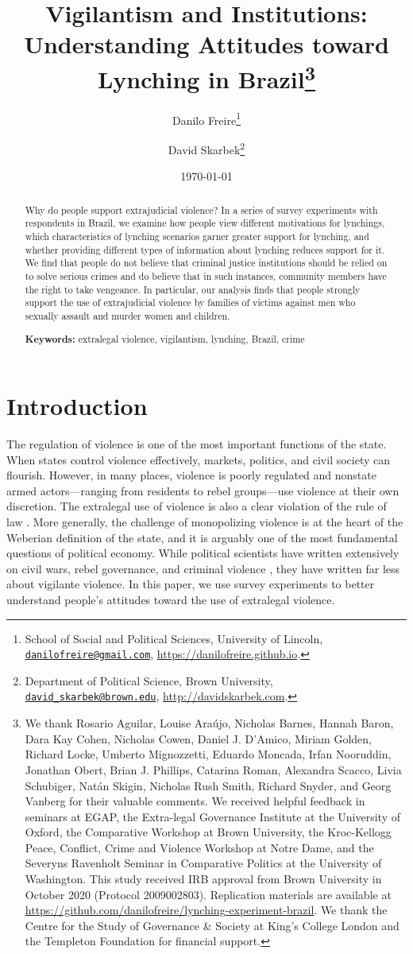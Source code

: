 \documentclass[12pt,ansiapaper]{article}
\title{Vigilantism and Institutions:\\ Understanding Attitudes toward Lynching in Brazil\footnote{We thank Rosario Aguilar, Louise Araújo, Nicholas Barnes, Hannah Baron, Dara Kay Cohen, Nicholas Cowen, Daniel J. D'Amico, Miriam Golden, Richard Locke, Umberto Mignozzetti, Eduardo Moncada, Irfan Nooruddin, Jonathan Obert, Brian J. Phillips, Catarina Roman, Alexandra Scacco, Livia Schubiger, Natán Skigin, Nicholas Rush Smith, Richard Snyder, and Georg Vanberg for their valuable comments. We received helpful feedback in seminars at EGAP, the Extra-legal Governance Institute at the University of Oxford, the Comparative Workshop at Brown University, the Kroc-Kellogg Peace, Conflict, Crime and Violence Workshop at Notre Dame, and the Severyns Ravenholt Seminar in Comparative Politics at the University of Washington. This study received IRB approval from Brown University in October 2020 (Protocol 2009002803). Replication materials are available at \url{https://github.com/danilofreire/lynching-experiment-brazil}. We thank the Centre for the Study of Governance \& Society at King's College London and the Templeton Foundation for financial support.}}
\author{Danilo Freire\footnote{School of Social and Political Sciences, University of Lincoln, \href{mailto:danilofreire@gmail.com}{\texttt{danilofreire@gmail.com}}, \url{https://danilofreire.github.io}.} \and David Skarbek\footnote{Department of Political Science, Brown University, \href{mailto:david_skarbek@brown.edu}{\texttt{david\_skarbek@brown.edu}}, \url{http://davidskarbek.com}.}}
\date{\today}
\begin{document}
\maketitle

\begin{abstract}
\doublespacing \noindent Why do people support extrajudicial violence? In a series of survey experiments with respondents in Brazil, we examine how people view different motivations for lynchings, which characteristics of lynching scenarios garner greater support for lynching, and whether providing different types of information about lynching reduces support for it. We find that people do not believe that criminal justice institutions should be relied on to solve serious crimes and do believe that in such instances, community members have the right to take vengeance. In particular, our analysis finds that people strongly support the use of extrajudicial violence by families of victims against men who sexually assault and murder women and children. 
\vspace{.25cm}

\noindent \textbf{Keywords:} extralegal violence, vigilantism, lynching, Brazil, crime 
\vspace{.25cm}

\end{abstract}

\newpage

\section{Introduction}
\label{sec:introduction}

\doublespacing

The regulation of violence is one of the most important functions of the state. When states control violence effectively, markets, politics, and civil society can flourish. However, in many places, violence is poorly regulated and nonstate armed actors---ranging from residents to rebel groups---use violence at their own discretion. The extralegal use of violence is also a clear violation of the rule of law \citep[48-49]{blair2020peacekeeping}. More generally, the challenge of monopolizing violence is at the heart of the Weberian definition of the state, and it is arguably one of the most fundamental questions of political economy. While political scientists have written extensively on civil wars, rebel governance, and criminal violence \citep{arjona2016rebelocracy, trejo2021high, barnes2017criminal}, they have written far less about vigilante violence. In this paper, we use survey experiments to better understand people's attitudes toward the use of extralegal violence. 
\end{document}
